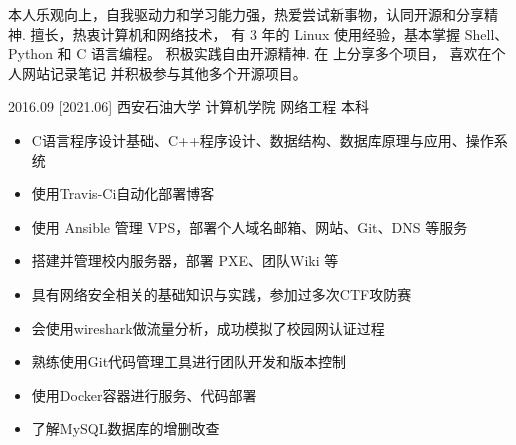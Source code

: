 \documentclass[zh]{resume}
\begin{document}
\makeheader

{\onehalfspacing\hspace{2em}%
本人乐观向上，自我驱动力和学习能力强，热爱尝试新事物，认同开源和分享精神.
擅长，热衷计算机和网络技术，
有 3 年的 Linux 使用经验，基本掌握 Shell、Python 和 C 语言编程。
积极实践自由开源精神.
在  上分享多个项目，
喜欢在个人网站记录笔记
并积极参与其他多个开源项目。
\par}

\begin{competences}
\end{competences}

\begin{educations}
  \education%
    {2016.09}%
    [2021.06]%
    {西安石油大学}%
    {计算机学院}%
    {网络工程}%
    {本科}
\end{educations}
\begin{itemize}
  \item C语言程序设计基础、C++程序设计、数据结构、数据库原理与应用、操作系统
\end{itemize}
\begin{itemize}
  \item 使用Travis-Ci自动化部署博客
  \item 使用 Ansible 管理 VPS，部署个人域名邮箱、网站、Git、DNS 等服务
  \item 搭建并管理校内服务器，部署 PXE、团队Wiki 等
  \item 具有网络安全相关的基础知识与实践，参加过多次CTF攻防赛
  \item 会使用wireshark做流量分析，成功模拟了校园网认证过程
  \item 熟练使用Git代码管理工具进行团队开发和版本控制
  \item 使用Docker容器进行服务、代码部署
  \item 了解MySQL数据库的增删改查
\end{itemize}
\end{document}
